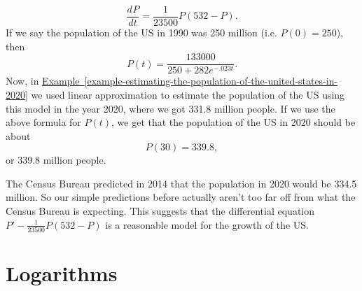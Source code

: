 \documentclass[10pt,]{book}
\theoremstyle{ptxplainnotitle}
\theoremstyle{ptxplaintitle}
\theoremstyle{ptxplainnotitle}
\theoremstyle{ptxplaintitle}
\theoremstyle{ptxplainnotitle}
\theoremstyle{ptxplaintitle}
\theoremstyle{ptxdefinitionnotitle}
\theoremstyle{ptxdefinitiontitle}
\theoremstyle{ptxdefinitionnotitle}
\theoremstyle{ptxdefinitiontitle}
\theoremstyle{ptxdefinitionnotitle}
\theoremstyle{ptxdefinitiontitle}
\theoremstyle{ptxdefinitionnotitle}
\theoremstyle{ptxdefinitiontitle}
\theoremstyle{ptxdefinitionnotitle}
\theoremstyle{ptxdefinitiontitle}
\numberwithin{equation}{section}
\newcommand{\dv}[3][]{\dfrac{d^{#1} #2}{d #3^{#1}}}
\begin{document}
\begin{equation*}
\dv{P}{t} = \frac{1}{23500}P(532 - P).
\end{equation*}
If we say the population of the US in 1990 was 250 million (i.e. \(P(0) = 250\)), then%
\begin{equation*}
P(t) = \frac{133000}{250 + 282e^{-.023t}}.
\end{equation*}
Now, in \hyperref[example-estimating-the-population-of-the-united-states-in-2020]{Example~\ref{example-estimating-the-population-of-the-united-states-in-2020}} we used linear approximation to estimate the population of the US using this model in the year 2020, where we got 331.8 million people. If we use the above formula for \(P(t)\), we get that the population of the US in 2020 should be about%
\begin{equation*}
P(30) = 339.8,
\end{equation*}
or 339.8 million people.%
\begin{aside}{}\label{aside-6}
\hypertarget{p-197}{}%
The Census Bureau predicted in 2014 that the population in 2020 would be 334.5 million. So our simple predictions before actually aren't too far off from what the Census Bureau is expecting. This suggests that the differential equation \(P' - \frac{1}{23500}P(532-P)\) is a reasonable model for the growth of the US.%
\end{aside}
\typeout{************************************************}
\typeout{************************************************}
\section[{Logarithms}]{Logarithms}\label{section-logarithms}
\typeout{************************************************}
\typeout{************************************************}
\end{document}
